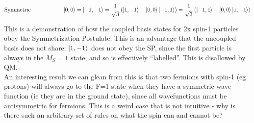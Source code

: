\documentclass[10pt]{article} %
\begin{document}
\begin{align*}
  \mbox{Symmetric}\hspace{2cm} &\ket{0,0} = \ket{-1,-1} =
  \frac{1}{\sqrt{3}}\left(\ket{1,-1} - \ket{0,0} \ket{-1,1}\right)
  = \frac{1}{\sqrt{3}}\left(\ket{-1,1} - \ket{0,0} \ket{1,-1}\right)\\
\end{align*}

This is a demonstration of how the coupled basis states for 2x spin-1 particles
obey the Symmetrization Postulate. This is an advantage that the uncoupled basis
does not share: $\ket{1,-1}$ does not obey the SP, since the first particle is always
in the $M_S = 1$ state, and so is effectively ``labelled''. This is disallowed
by QM.\\

An interesting result we can glean from this is that two fermions with
spin-1 (eg protons) will always go to the F=1 state when they have a symmetric
wave function (ie they are in the ground state), since all wavefunctions must be
antisymmetric for fermions. This is a weird case that is not intuitive - why is
there such an arbitrary set of rules on what the spin can and cannot be?\\
\end{document}

